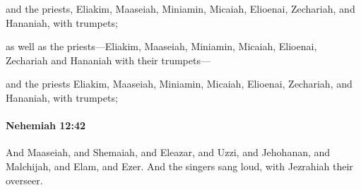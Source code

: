 			\begin{versebox}
					\item[BHS] 
					\item[ASV] and the priests, Eliakim, Maaseiah, Miniamin, Micaiah, Elioenai, Zechariah, and Hananiah, with trumpets;
					\item[NIV] as well as the priests—Eliakim, Maaseiah, Miniamin, Micaiah, Elioenai, Zechariah and Hananiah with their trumpets—
					\item[NRSV] and the priests Eliakim, Maaseiah, Miniamin, Micaiah, Elioenai, Zechariah, and Hananiah, with trumpets;
			\end{versebox}

		\paragraph{Nehemiah 12:42} %
			\label{NEHEMIAH-12-42}

			And Maaseiah, and Shemaiah, and Eleazar, and Uzzi, and Jehohanan, and Malchijah, and Elam, and Ezer. And the singers sang loud, with Jezrahiah their overseer.


